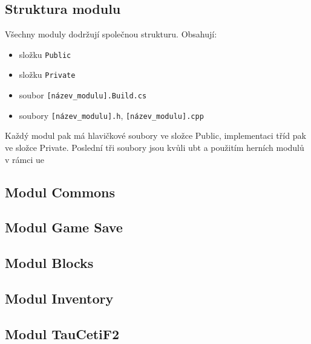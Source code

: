 \subsection{Struktura modulu}
Všechny moduly dodržují společnou strukturu. Obsahují:
\begin{itemize}
	\item složku \verb!Public!
	\item složku \verb!Private!
	\item soubor \verb![název_modulu].Build.cs!
	\item soubory \verb![název_modulu].h!, \verb![název_modulu].cpp!
\end{itemize}


Každý modul pak má hlavičkové soubory ve složce Public, implementaci tříd pak ve složce Private. Poslední tři soubory jsou kvůli \gls{ubt} a použitím herních modulů v rámci \gls{ue}



\subsection{Modul Commons}



\subsection{Modul Game Save}



\subsection{Modul Blocks}



\subsection{Modul Inventory}



\subsection{Modul TauCetiF2}




